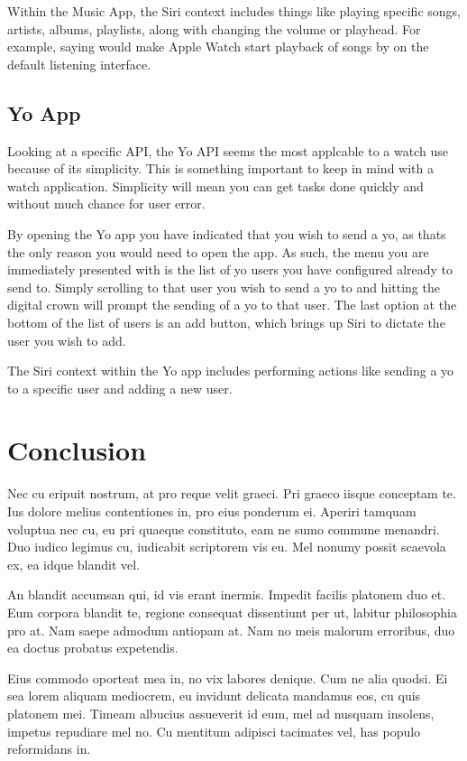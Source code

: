 \documentclass[journal,letterpaper]{article}
\begin{document}
    Within the Music App, the Siri context includes things like playing specific songs, artists, albums, playlists, along with changing the volume or playhead. For example, saying  would make Apple Watch start playback of songs by  on the default listening interface. 

    \subsection{Yo App}
    
    Looking at a specific API, the Yo API seems the most applcable to a watch use because of its simplicity. This is something important to keep in mind with a watch application. Simplicity will mean you can get tasks done quickly and without much chance for user error.

    By opening the Yo app you have indicated that you wish to send a yo, as thats the only reason you would need to open the app. As such, the menu you are immediately presented with is the list of yo users you have configured already to send to. Simply scrolling to that user you wish to send a yo to and hitting the digital crown will prompt the sending of a yo to that user. The last option at the bottom of the list of users is an add button, which brings up Siri to dictate the user you wish to add.

    The Siri context within the Yo app includes performing actions like sending a yo to a specific user and adding a new user.

    \section{Conclusion}
    \label{conclusion}

    Nec cu eripuit nostrum, at pro reque velit graeci. Pri graeco iisque conceptam te. Ius dolore melius contentiones in, pro eius ponderum ei. Aperiri tamquam voluptua nec cu, eu pri quaeque constituto, eam ne sumo commune menandri. Duo iudico legimus cu, iudicabit scriptorem vis eu. Mel nonumy possit scaevola ex, ea idque blandit vel.

    An blandit accumsan qui, id vis erant inermis. Impedit facilis platonem duo et. Eum corpora blandit te, regione consequat dissentiunt per ut, labitur philosophia pro at. Nam saepe admodum antiopam at. Nam no meis malorum erroribus, duo ea doctus probatus expetendis.

    Eius commodo oporteat mea in, no vix labores denique. Cum ne alia quodsi. Ei sea lorem aliquam mediocrem, eu invidunt delicata mandamus eos, cu quis platonem mei. Timeam albucius assueverit id eum, mel ad nusquam insolens, impetus repudiare mel no. Cu mentitum adipisci tacimates vel, has populo reformidans in.
\end{document}
